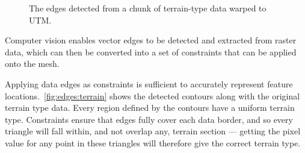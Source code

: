 \documentclass[12pt]{article}
\begin{document}
\begin{figure}[!htbp]
  \centering
  \caption{The edges detected from a chunk of terrain-type data warped to UTM.}\label{fig:edges:terrain}
\end{figure}

Computer vision enables vector edges to be detected and extracted from raster data, which can then be converted into a set of constraints that can be applied onto the mesh.

Applying data edges as constraints is sufficient to accurately represent feature locations.\ \autoref{fig:edges:terrain} shows the detected contours along with the original terrain type data. Every region defined by the contours have a uniform terrain type. Constraints ensure that edges fully cover each data border, and so every triangle will fall within, and not overlap any, terrain section --- getting the pixel value for any point in these triangles will therefore give the correct terrain type.
\end{document}
